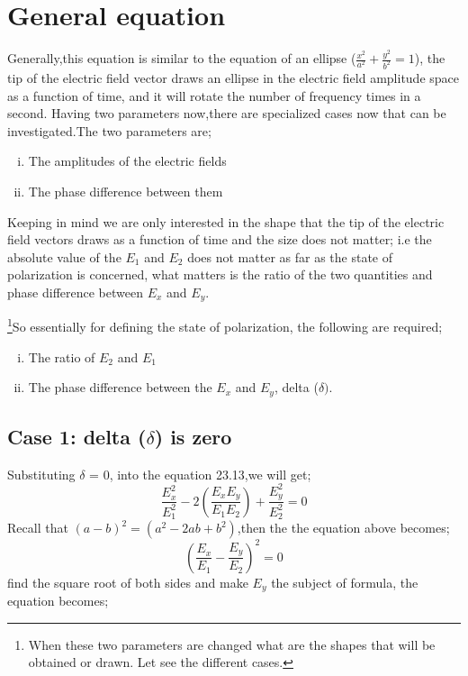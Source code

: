 \section{General equation }
Generally,this equation is similar to the equation of an ellipse ($\frac{x^2}{a^2} + \frac{y^2}{b^2} = 1 $), the tip of the electric field vector draws an ellipse in the electric field amplitude space as a function of time, and it will rotate the number of frequency times in a second. Having two parameters now,there are specialized cases now that can be investigated.The two parameters are;
\begin{enumerate}[(i)]
\item The amplitudes of the electric fields
\item The phase difference between them
\end{enumerate}
Keeping in mind we are only interested in the shape that the tip of the electric field vectors draws as a function of time and the size does not matter; i.e the absolute value of the $ E_1 $ and $ E_2 $ does not matter as far as the state of polarization is concerned, what matters is the ratio of the two quantities and phase difference between $ E_x $ and $ E_y $.

\footnote{When these two parameters are changed what are the shapes that will be obtained or drawn. Let see the different cases.}So essentially for defining the state of polarization, the following  are required;
\begin{enumerate}[(i)] 
\item The ratio of $ E_2 $ and $ E_1 $
\item The phase difference between the $ E_x $ and $ E_y $, delta ($\delta)$.
\end{enumerate}

\subsection{Case 1: delta ($\delta $) is zero}
Substituting $\delta$ = 0, into the equation 23.13,we will get;
\begin{equation}
\frac{E_{x}^2}{E_{1}^2} -2(\frac{E_{x}E_{y}}{E_{1}E_{2}}) + \frac{E_{y}^2}{E_{2}^2} = 0
\end{equation}
Recall that ${(a - b)}^2 = (a^2 -2ab +b^2)$,then the the equation above becomes;
\begin{equation}
{(\frac{E_x}{E_1} - \frac{E_y}{E_2})}^2 = 0
\end{equation}
find the square root of both sides and make $ E_y $ the subject of formula, the equation becomes;

